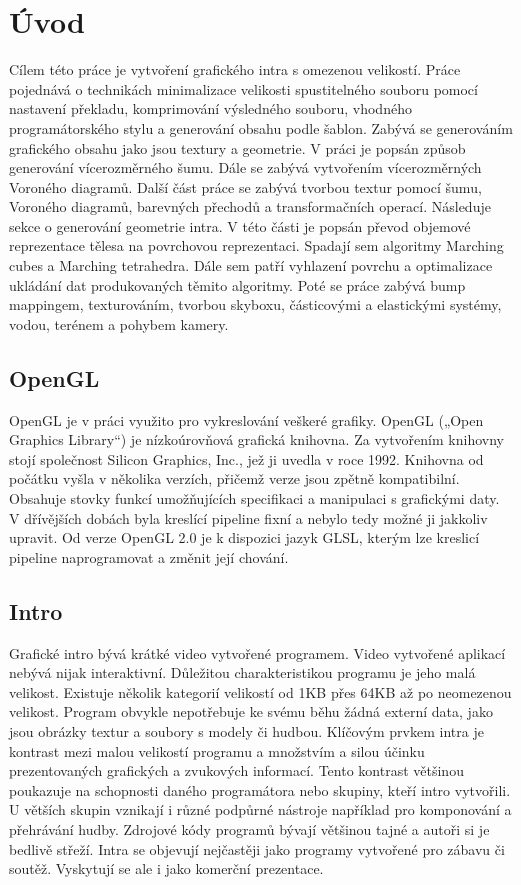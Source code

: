 
\chapter{Úvod}
Cílem této práce je vytvoření grafického intra s omezenou velikostí.
Práce pojednává o technikách minimalizace velikosti spustitelného souboru pomocí nastavení překladu, komprimování výsledného souboru, vhodného programátorského stylu a generování obsahu podle šablon.
Zabývá se generováním grafického obsahu jako jsou textury a geometrie.
V práci je popsán způsob generování vícerozměrného šumu.
Dále se zabývá vytvořením vícerozměrných Voroného diagramů.
Další část práce se zabývá tvorbou textur pomocí šumu, Voroného diagramů, barevných přechodů a transformačních operací.
Následuje sekce o generování geometrie intra.
V této části je popsán převod objemové reprezentace tělesa na povrchovou reprezentaci.
Spadají sem algoritmy Marching cubes a Marching tetrahedra.
Dále sem patří vyhlazení povrchu a optimalizace ukládání dat produkovaných těmito algoritmy.
Poté se práce zabývá bump mappingem, texturováním, tvorbou skyboxu, částicovými a elastickými systémy, vodou, terénem a pohybem kamery.

\section{OpenGL}
OpenGL je v práci využito pro vykreslování veškeré grafiky.
OpenGL („Open Graphics Library“) je nízkoúrovňová grafická knihovna.
Za vytvořením knihovny stojí společnost Silicon Graphics, Inc., jež ji uvedla v roce 1992.
Knihovna od počátku vyšla v několika verzích, přičemž verze jsou zpětně kompatibilní.
Obsahuje stovky funkcí umožňujících specifikaci a manipulaci s grafickými daty.
V dřívějších dobách byla kreslící pipeline fixní a nebylo tedy možné ji jakkoliv upravit.
Od verze OpenGL 2.0 je k dispozici jazyk GLSL, kterým lze kreslicí pipeline naprogramovat a změnit její chování.

\section{Intro}
Grafické intro bývá krátké video vytvořené programem.
Video vytvořené aplikací nebývá nijak interaktivní.
Důležitou charakteristikou programu je jeho malá velikost.
Existuje několik kategorií velikostí od 1KB přes 64KB až po neomezenou velikost.
Program obvykle nepotřebuje ke svému běhu žádná externí data, jako jsou obrázky textur a soubory s modely či hudbou.
Klíčovým prvkem intra je kontrast mezi malou velikostí programu a množstvím a silou účinku prezentovaných grafických a zvukových informací.
Tento kontrast většinou poukazuje na schopnosti daného programátora nebo skupiny, kteří intro vytvořili.
U větších skupin vznikají i různé podpůrné nástroje například pro komponování a přehrávání hudby.
Zdrojové kódy programů bývají většinou tajné a autoři si je bedlivě střeží.
Intra se objevují nejčastěji jako programy vytvořené pro zábavu či soutěž.
Vyskytují se ale i jako komerční prezentace.

